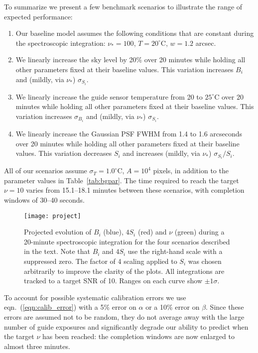 \documentclass[11pt]{article}
\providecommand{\eqn}[1]{eqn.~(\ref{eqn:#1})}
\providecommand{\tab}[1]{Table~\ref{tab:#1}}
\begin{document}
To summarize we present a few benchmark scenarios to illustrate the range of expected performance:
\begin{enumerate}
\item Our baseline model assumes the following conditions that are constant during the spectroscopic integration: $\nu_{\ast} = 100$, $T = 20^\circ$C, $w = 1.2$ arcsec.
\item We linearly increase the sky level by 20\% over 20 minutes while holding all other parameters fixed at their baseline values. This variation increases $B_i$ and (mildly, via $\nu_{\ast}$) $\sigma_{S_i}$.
\item We linearly increase the guide sensor temperature from 20 to $25^\circ$C over 20 minutes while holding all other parameters fixed at their baseline values. This variation increases $\sigma_{B_i}$ and (mildly, via $\nu_{\ast}$) $\sigma_{S_i}$.
\item We linearly increase the Gaussian PSF FWHM from 1.4 to 1.6 arcseconds over 20 minutes while holding all other parameters fixed at their baseline values. This variation decreases $S_i$ and increases (mildly, via $\nu_{\ast}$) $\sigma_{S_i}/S_i$.
\end{enumerate}
All of our scenarios assume $\sigma_T = 1.0^\circ$C, $A = 10^4$ pixels, in addition to the parameter values in \tab{bgpar}. The time required to reach the target $\nu = 10$ varies from 15.1--18.1 minutes between these scenarios, with completion windows of 30--40 seconds.

\begin{figure}[htb]
\begin{center}
\texttt{[image: project]}
\caption{Projected evolution of $B_i$ (blue), $4 S_i$ (red) and $\nu$ (green) during a 20-minute spectroscopic integration for the four scenarios described in the text. Note that $B_i$ and $4 S_i$ use the right-hand scale with a suppressed zero.  The factor of 4 scaling applied to $S_i$ was chosen arbitrarily to improve the clarity of the plots. All integrations are tracked to a target SNR of 10. Ranges on each curve show $\pm 1\sigma$.}
\label{fig:project}
\end{center}
\end{figure}

To account for possible systematic calibration errors we use
\eqn{calib_error} with a 5\% error on $\alpha$ or a 10\% error on
$\beta$. Since these errors are assumed not to be random, they do not
average away with the large number of guide exposures and
significantly degrade our ability to predict when the target $\nu$ has
been reached: the completion windows are now enlarged to almost three
minutes.
\end{document}
